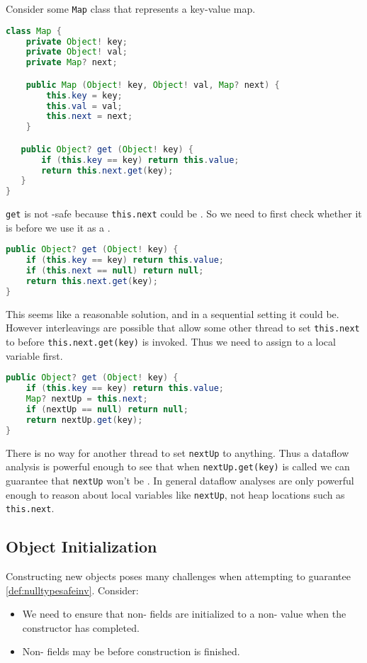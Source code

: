 \documentclass{article}
\begin{document}
\begin{example}
  Consider some \texttt{Map} class that represents a key-value map.
\begin{lstlisting}[language=Java]
class Map {
    private Object! key;
    private Object! val;
    private Map? next;

    public Map (Object! key, Object! val, Map? next) {
        this.key = key;
        this.val = val;
        this.next = next;
    }

   public Object? get (Object! key) {
       if (this.key == key) return this.value;
       return this.next.get(key);
   }
}
\end{lstlisting}
  \texttt{get} is not \cringe{}-safe because \texttt{this.next} could be \cringe{}.
  So we need to first check whether it is \cringe{} before we use it as a \receiver{}.
\begin{lstlisting}[language=Java]
public Object? get (Object! key) {
    if (this.key == key) return this.value;
    if (this.next == null) return null;
    return this.next.get(key);
}
\end{lstlisting}
  This seems like a reasonable solution, and in a sequential setting it could be.
  However interleavings are possible that allow some other thread to set \texttt{this.next} to \cringe{} before \texttt{this.next.get(key)} is invoked.
  Thus we need to assign to a local variable first.
\begin{lstlisting}[language=Java]
public Object? get (Object! key) {
    if (this.key == key) return this.value;
    Map? nextUp = this.next;
    if (nextUp == null) return null;
    return nextUp.get(key);
}
\end{lstlisting}
  There is no way for another thread to set \texttt{nextUp} to anything.
  Thus a dataflow analysis is powerful enough to see that when \texttt{nextUp.get(key)} is called we can guarantee that \texttt{nextUp} won't be \cringe{}.
  In general dataflow analyses are only powerful enough to reason about local variables like \texttt{nextUp}, not heap locations such as \texttt{this.next}.
\end{example}

\subsection{Object Initialization}

Constructing new objects poses many challenges when attempting to guarantee \ref{def:nulltypesafeinv}.
Consider:
\begin{itemize}
\item We need to ensure that non-\cringe{} fields are initialized to a non-\cringe{} value when the constructor has completed.
\item Non-\cringe{} fields may be \cringe{} before construction is finished.
\end{itemize}
\end{document}
